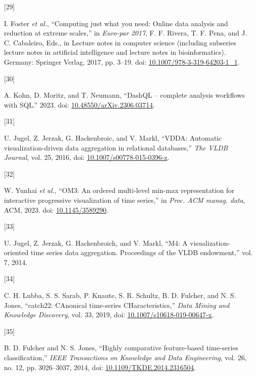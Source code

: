\documentclass{article}
\newlength{\cslhangindent}
\newlength{\csllabelwidth}
\newlength{\cslentryspacingunit} %
\newenvironment{CSLReferences}[2] %
 {%
  \setlength{\parindent}{0pt}
  \ifodd #1
  \let\oldpar\par
  \def\par{\hangindent=\cslhangindent\oldpar}
  \fi
  \setlength{\parskip}{#2\cslentryspacingunit}
 }%
 {}
\newcommand{\CSLLeftMargin}[1]{\parbox[t]{\csllabelwidth}{#1}}
\newcommand{\CSLRightInline}[1]{\parbox[t]{\linewidth - \csllabelwidth}{#1}\break}
\begin{document}
\begin{CSLReferences}{0}{0}
\leavevmode{}%
\CSLLeftMargin{{[}29{]} }
\CSLRightInline{I. Foster \emph{et al.}, {``Computing just what you
need: Online data analysis and reduction at extreme scales,''} in
\emph{Euro-par 2017}, F. F. Rivera, T. F. Pena, and J. C. Cabaleiro,
Eds., in Lecture notes in computer science (including subseries lecture
notes in artificial intelligence and lecture notes in bioinformatics).
Germany: Springer Verlag, 2017, pp. 3--19. doi:
\href{https://doi.org/10.1007/978-3-319-64203-1_1}{10.1007/978-3-319-64203-1\_1}.}

\leavevmode{}%
\CSLLeftMargin{{[}30{]} }
\CSLRightInline{A. Kohn, D. Moritz, and T. Neumann, {``DashQL --
complete analysis workflows with SQL.''} 2023. doi:
\href{https://doi.org/10.48550/arXiv.2306.03714}{10.48550/arXiv.2306.03714}.}

\leavevmode{}%
\CSLLeftMargin{{[}31{]} }
\CSLRightInline{U. Jugel, Z. Jerzak, G. Hackenbroic, and V. Markl,
{``VDDA: Automatic visualization-driven data aggregation in relational
databases,''} \emph{The VLDB Journal}, vol. 25, 2016, doi:
\href{https://doi.org/10.1007/s00778-015-0396-z}{10.1007/s00778-015-0396-z}.}

\leavevmode{}%
\CSLLeftMargin{{[}32{]} }
\CSLRightInline{W. Yunhai \emph{et al.}, {``OM3: An ordered multi-level
min-max representation for interactive progressive visualization of time
series,''} in \emph{Proc. ACM manag. data}, ACM, 2023. doi:
\href{https://doi.org/10.1145/3589290}{10.1145/3589290}.}

\leavevmode{}%
\CSLLeftMargin{{[}33{]} }
\CSLRightInline{U. Jugel, Z. Jerzak, G. Hackenbroich, and V. Markl,
{``M4: A visualization-oriented time series data aggregation.
Proceedings of the VLDB endowment,''} vol. 7, 2014.}

\leavevmode{}%
\CSLLeftMargin{{[}34{]} }
\CSLRightInline{C. H. Lubba, S. S. Sarab, P. Knaute, S. R. Schultz, B.
D. Fulcher, and N. S. Jones, {``catch22: CAnonical time-series
CHaracteristics,''} \emph{Data Mining and Knowledge Discovery}, vol. 33,
2019, doi:
\href{https://doi.org/10.1007/s10618-019-00647-x}{10.1007/s10618-019-00647-x}.}

\leavevmode{}%
\CSLLeftMargin{{[}35{]} }
\CSLRightInline{B. D. Fulcher and N. S. Jones, {``Highly comparative
feature-based time-series classification,''} \emph{IEEE Transactions on
Knowledge and Data Engineering}, vol. 26, no. 12, pp. 3026--3037, 2014,
doi:
\href{https://doi.org/10.1109/TKDE.2014.2316504}{10.1109/TKDE.2014.2316504}.}


\end{CSLReferences}
\end{document}
